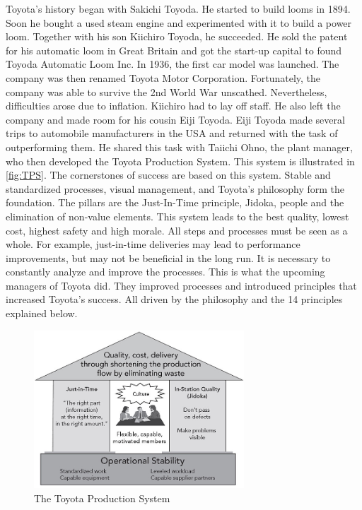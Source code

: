 \documentclass[11pt,a4paper]{article}
\begin{document}
Toyota's history began with Sakichi Toyoda. He started to build looms in
1894. Soon he bought a used steam engine and experimented with it to build a
power loom. Together with his son Kiichiro Toyoda, he succeeded. He sold the
patent for his automatic loom in Great Britain and got the start-up capital to
found Toyoda Automatic Loom Inc. In 1936, the first car model was launched.
The company was then renamed Toyota Motor Corporation. Fortunately, the
company was able to survive the 2nd World War unscathed. Nevertheless,
difficulties arose due to inflation. Kiichiro had to lay off staff. He also
left the company and made room for his cousin Eiji Toyoda. Eiji Toyoda made
several trips to automobile manufacturers in the USA and returned with the
task of outperforming them. He shared this task with Taiichi Ohno, the plant
manager, who then developed the Toyota Production System. This system is
illustrated in \autoref{fig:TPS}. The cornerstones of success are based on
this system. Stable and standardized processes, visual management, and
Toyota's philosophy form the foundation. The pillars are the Just-In-Time
principle, Jidoka, people and the elimination of non-value elements. This
system leads to the best quality, lowest cost, highest safety and high
morale. All steps and processes must be seen as a whole. For example,
just-in-time deliveries may lead to performance improvements, but may not be
beneficial in the long run. It is necessary to constantly analyze and improve
the processes. This is what the upcoming managers of Toyota did. They improved
processes and introduced principles that increased Toyota's success. All
driven by the philosophy and the 14 principles explained below.

\begin{figure}[h] 
  \centering
     \includegraphics[width=0.7\textwidth]{toyota_production_system.png}
  \caption{The Toyota Production System}
  \label{fig:TPS}
\end{figure}
\end{document}
